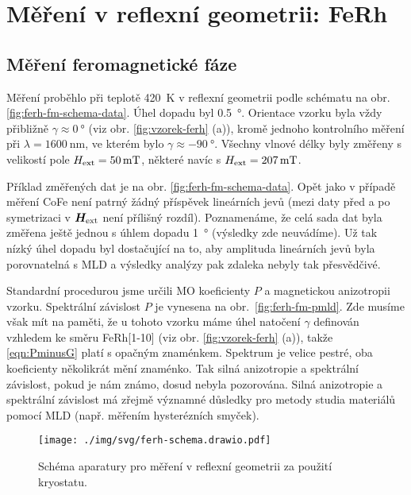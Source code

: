 \section{Měření v reflexní geometrii: FeRh}
\label{chap:vysledky-ferh}

\subsection{Měření feromagnetické fáze}
\label{chap:ferh-fm}

Měření proběhlo při teplotě \SI{420}{\kelvin} v reflexní geometrii podle schématu na obr. \ref{fig:ferh-fm-schema-data}.
Úhel dopadu byl \SI{0.5}{\degree}.
Orientace vzorku byla vždy přibližně $\gamma\approx\SI{0}{\degree}$ (viz obr. \ref{fig:vzorek-ferh} (a)), kromě jednoho kontrolního měření při $\lambda=\SI{1600}{\nano\meter}$, ve kterém bylo $\gamma\approx\SI{-90}{\degree}$.
Všechny vlnové délky byly změřeny s velikostí pole $H_\textrm{ext}=\SI{50}{\milli\tesla}$, některé navíc s $H_\textrm{ext}=\SI{207}{\milli\tesla}$.

Příklad změřených dat je na obr. \ref{fig:ferh-fm-schema-data}.
Opět jako v případě měření CoFe není patrný žádný příspěvek lineárních jevů (mezi daty před a po symetrizaci v $\bm{H}_\textrm{ext}$ není přílišný rozdíl).
Poznamenáme, že celá sada dat byla změřena ještě jednou s úhlem dopadu \SI{1}{\degree} (výsledky zde neuvádíme).
Už tak nízký úhel dopadu byl dostačující na to, aby amplituda lineárních jevů byla porovnatelná s MLD a výsledky analýzy pak zdaleka nebyly tak přesvědčivé.

Standardní procedurou jsme určili MO koeficienty $P$ a magnetickou anizotropii vzorku.
Spektrální závislost $P$ je vynesena na obr.~\ref{fig:ferh-fm-pmld}.
Zde musíme však mít na paměti, že u tohoto vzorku máme úhel natočení $\gamma$ definován vzhledem ke směru FeRh[1-10] (viz obr. \ref{fig:vzorek-ferh} (a)), takže \eqref{eqn:PminusG} platí s opačným znaménkem.
Spektrum je velice pestré, oba koeficienty několikrát mění znaménko.
Tak silná anizotropie a spektrální závislost, pokud je nám známo, dosud nebyla pozorována.
Silná anizotropie a spektrální závislost má zřejmě významné důsledky pro metody studia materiálů pomocí MLD (např. měřením hysterézních smyček)\cite{tesarovaSystematicStudyMagnetic2014}.

\begin{figure}[htbp]
    \centering
    \texttt{[image: ./img/svg/ferh-schema.drawio.pdf]}
    \caption{Schéma aparatury pro měření v reflexní geometrii za použití kryostatu.}
    \label{fig:ferh-schema}
\end{figure}

